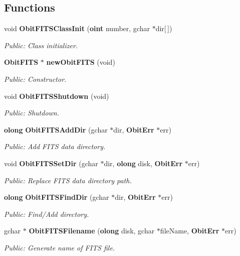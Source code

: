 \subsection*{Functions}
\begin{CompactItemize}
\item 
void {\bf Obit\-FITSClass\-Init} ({\bf oint} number, gchar $\ast$dir[$\,$])
\begin{CompactList}\small\item\em Public: Class initializer. \item\end{CompactList}\item 
{\bf Obit\-FITS} $\ast$ {\bf new\-Obit\-FITS} (void)
\begin{CompactList}\small\item\em Public: Constructor. \item\end{CompactList}\item 
void {\bf Obit\-FITSShutdown} (void)
\begin{CompactList}\small\item\em Public: Shutdown. \item\end{CompactList}\item 
{\bf olong} {\bf Obit\-FITSAdd\-Dir} (gchar $\ast$dir, {\bf Obit\-Err} $\ast$err)
\begin{CompactList}\small\item\em Public: Add FITS data directory. \item\end{CompactList}\item 
void {\bf Obit\-FITSSet\-Dir} (gchar $\ast$dir, {\bf olong} disk, {\bf Obit\-Err} $\ast$err)
\begin{CompactList}\small\item\em Public: Replace FITS data directory path. \item\end{CompactList}\item 
{\bf olong} {\bf Obit\-FITSFind\-Dir} (gchar $\ast$dir, {\bf Obit\-Err} $\ast$err)
\begin{CompactList}\small\item\em Public: Find/Add directory. \item\end{CompactList}\item 
gchar $\ast$ {\bf Obit\-FITSFilename} ({\bf olong} disk, gchar $\ast$file\-Name, {\bf Obit\-Err} $\ast$err)
\begin{CompactList}\small\item\em Public: Generate name of FITS file. \item\end{CompactList}\item 

\end{CompactItemize}
